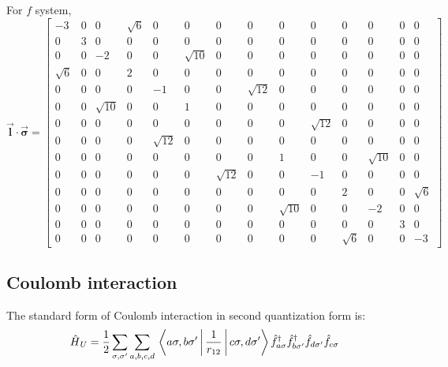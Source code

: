 For $f$ system,
\begin{equation}
\vec{\mathbf{l}}\cdot\vec{\mathbf{\sigma}}=\left[\begin{array}{cccccccccccccc}
-3 & 0 & 0 & \sqrt{6} & 0 & 0 & 0 & 0 & 0 & 0 & 0 & 0 & 0 & 0\\
0 & 3 & 0 & 0 & 0 & 0 & 0 & 0 & 0 & 0 & 0 & 0 & 0 & 0\\
0 & 0 & -2 & 0 & 0 & \sqrt{10} & 0 & 0 & 0 & 0 & 0 & 0 & 0 & 0\\
\sqrt{6} & 0 & 0 & 2 & 0 & 0 & 0 & 0 & 0 & 0 & 0 & 0 & 0 & 0\\
0 & 0 & 0 & 0 & -1 & 0 & 0 & \sqrt{12} & 0 & 0 & 0 & 0 & 0 & 0\\
0 & 0 & \sqrt{10} & 0 & 0 & 1 & 0 & 0 & 0 & 0 & 0 & 0 & 0 & 0\\
0 & 0 & 0 & 0 & 0 & 0 & 0 & 0 & 0 & \sqrt{12} & 0 & 0 & 0 & 0\\
0 & 0 & 0 & 0 & \sqrt{12} & 0 & 0 & 0 & 0 & 0 & 0 & 0 & 0 & 0\\
0 & 0 & 0 & 0 & 0 & 0 & 0 & 0 & 1 & 0 & 0 & \sqrt{10} & 0 & 0\\
0 & 0 & 0 & 0 & 0 & 0 & \sqrt{12} & 0 & 0 & -1 & 0 & 0 & 0 & 0\\
0 & 0 & 0 & 0 & 0 & 0 & 0 & 0 & 0 & 0 & 2 & 0 & 0 & \sqrt{6}\\
0 & 0 & 0 & 0 & 0 & 0 & 0 & 0 & \sqrt{10} & 0 & 0 & -2 & 0 & 0\\
0 & 0 & 0 & 0 & 0 & 0 & 0 & 0 & 0 & 0 & 0 & 0 & 3 & 0\\
0 & 0 & 0 & 0 & 0 & 0 & 0 & 0 & 0 & 0 & \sqrt{6} & 0 & 0 & -3
\end{array}\right]
\end{equation}



\subsection{Coulomb interaction}
The standard form of Coulomb interaction in second quantization form is:
\begin{equation}\label{eqn:coulomb}
\text{\ensuremath{\hat{H}}}_{U}=\frac{1}{2}\sum_{\sigma,\sigma^{\prime}}\sum_{a,b,c,d}\\
\Braket{a\sigma,b\sigma^{\prime}|\frac{1}{r_{12}}|c\sigma,d\sigma^{\prime}}\\
\hat{f}_{a\sigma}^{\dagger}\hat{f}_{b\sigma^{\prime}}^{\dagger}\hat{f}_{d\sigma^{\prime}}\hat{f}_{c\sigma}
\end{equation}

